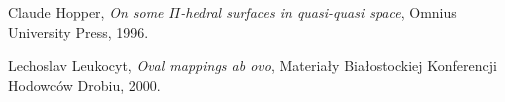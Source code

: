 \documentclass[licencjacka]{pracamgr}
\begin{document}
\begin{thebibliography}{99}


 Claude Hopper, \textit{On some $\Pi$-hedral
    surfaces in quasi-quasi space}, Omnius University Press, 1996.

 Lechoslav Leukocyt, \textit{Oval mappings ab ovo},
  Materiały Białostockiej Konferencji Hodowców Drobiu, 2000.


\end{thebibliography}
\end{document}
